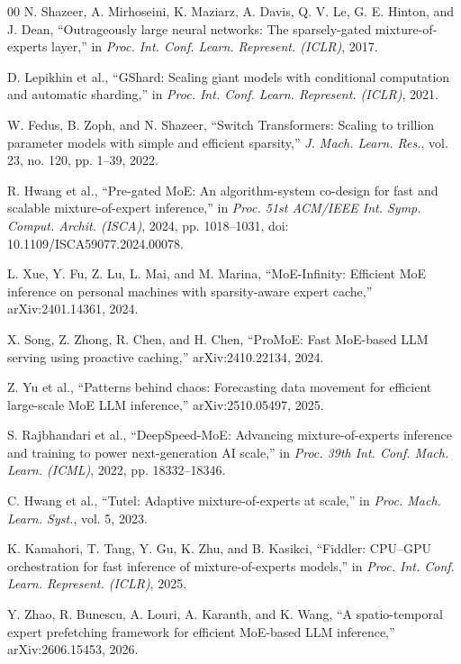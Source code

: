 \documentclass[conference]{IEEEtran}
\begin{document}
\begin{thebibliography}{00}
 N. Shazeer, A. Mirhoseini, K. Maziarz, A. Davis,
Q. V. Le, G. E. Hinton, and J. Dean, ``Outrageously large neural networks:
The sparsely-gated mixture-of-experts layer,'' in \emph{Proc. Int. Conf.
Learn. Represent. (ICLR)}, 2017.

 D. Lepikhin et al., ``GShard: Scaling giant models with
conditional computation and automatic sharding,'' in \emph{Proc. Int. Conf.
Learn. Represent. (ICLR)}, 2021.

 W. Fedus, B. Zoph, and N. Shazeer, ``Switch Transformers:
Scaling to trillion parameter models with simple and efficient sparsity,''
\emph{J. Mach. Learn. Res.}, vol. 23, no. 120, pp. 1--39, 2022.

 R. Hwang et al., ``Pre-gated MoE: An algorithm-system
co-design for fast and scalable mixture-of-expert inference,'' in
\emph{Proc. 51st ACM/IEEE Int. Symp. Comput. Archit. (ISCA)}, 2024,
pp. 1018--1031, doi: 10.1109/ISCA59077.2024.00078.

 L. Xue, Y. Fu, Z. Lu, L. Mai, and M. Marina,
``MoE-Infinity: Efficient MoE inference on personal machines with
sparsity-aware expert cache,'' arXiv:2401.14361, 2024.

 X. Song, Z. Zhong, R. Chen, and H. Chen, ``ProMoE: Fast
MoE-based LLM serving using proactive caching,'' arXiv:2410.22134, 2024.

 Z. Yu et al., ``Patterns behind chaos: Forecasting data
movement for efficient large-scale MoE LLM inference,'' arXiv:2510.05497,
2025.

 S. Rajbhandari et al., ``DeepSpeed-MoE: Advancing
mixture-of-experts inference and training to power next-generation AI scale,''
in \emph{Proc. 39th Int. Conf. Mach. Learn. (ICML)}, 2022,
pp. 18332--18346.

 C. Hwang et al., ``Tutel: Adaptive mixture-of-experts at
scale,'' in \emph{Proc. Mach. Learn. Syst.}, vol. 5, 2023.

 K. Kamahori, T. Tang, Y. Gu, K. Zhu, and B. Kasikci,
``Fiddler: CPU--GPU orchestration for fast inference of mixture-of-experts
models,'' in \emph{Proc. Int. Conf. Learn. Represent. (ICLR)}, 2025.

 Y. Zhao, R. Bunescu, A. Louri, A. Karanth, and K. Wang, ``A
spatio-temporal expert prefetching framework for efficient MoE-based LLM
inference,'' arXiv:2606.15453, 2026.


\end{thebibliography}
\end{document}
